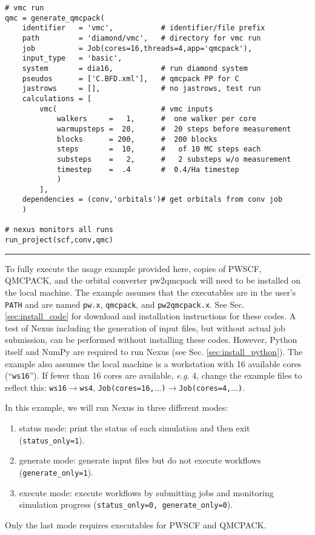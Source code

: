 \documentclass[oneside,11pt]{memoir}
\numberwithin{equation}{section}
\newcommand{\HRule}{\rule{\linewidth}{0.5mm}}
\begin{document}
\begin{verbatim}
# vmc run
qmc = generate_qmcpack(
    identifier   = 'vmc',           # identifier/file prefix 
    path         = 'diamond/vmc',   # directory for vmc run
    job          = Job(cores=16,threads=4,app='qmcpack'),
    input_type   = 'basic',
    system       = dia16,           # run diamond system
    pseudos      = ['C.BFD.xml'],   # qmcpack PP for C
    jastrows     = [],              # no jastrows, test run
    calculations = [
        vmc(                        # vmc inputs
            walkers     =   1,      #  one walker per core
            warmupsteps =  20,      #  20 steps before measurement
            blocks      = 200,      #  200 blocks
            steps       =  10,      #   of 10 MC steps each
            substeps    =   2,      #   2 substeps w/o measurement
            timestep    =  .4       #  0.4/Ha timestep
            )
        ],
    dependencies = (conv,'orbitals')# get orbitals from conv job
    )

# nexus monitors all runs
run_project(scf,conv,qmc)
\end{verbatim}
\HRule


To fully execute the usage example provided here, copies of PWSCF, QMCPACK, and the orbital converter pw2qmcpack will need to be installed on the local machine.  The example assumes that the executables are in the user's \texttt{PATH} and are named \texttt{pw.x}, \texttt{qmcpack}, and \texttt{pw2qmcpack.x}.  See Sec. \ref{sec:install_code} for download and installation instructions for these codes. A test of Nexus including the generation of input files, but without actual job submission, can be performed without installing these codes.  However, Python itself and NumPy are required to run Nexus (see Sec. \ref{sec:install_python}).    The example also assumes the local machine is a workstation with 16 available cores (``\texttt{ws16}'').  If fewer than 16 cores are available, \emph{e.g.} 4, change the example files to reflect this: \texttt{ws16}$\rightarrow$\texttt{ws4}, \texttt{Job(cores=16,$\ldots$)}$\rightarrow$\texttt{Job(cores=4,$\ldots$)}. 

In this example, we will run Nexus in three different modes:
\begin{enumerate}
  \item{status mode: print the status of each simulation and then exit (\texttt{status\_only=1}).}
  \item{generate mode: generate input files but do not execute workflows (\texttt{generate\_only=1}).}
  \item{execute mode: execute workflows by submitting jobs and monitoring simulation progress (\texttt{status\_only=0, generate\_only=0}).}
\end{enumerate}
Only the last mode requires executables for PWSCF and QMCPACK.
\end{document}
